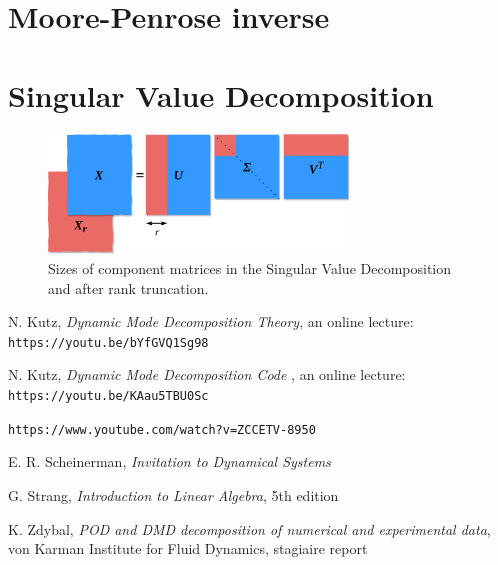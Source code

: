 \documentclass[10pt,twocolumn]{article}
\begin{document}
\section{Moore-Penrose inverse} \label{app:B}




\section{Singular Value Decomposition} \label{app:C}


\begin{figure}[H]
\centering\includegraphics[width=8cm]{svd.png}
\caption{Sizes of component matrices in the Singular Value Decomposition and after rank truncation.}
\label{fig:linear_system}
\end{figure}


\thebibliography{}

 N. Kutz, \textit{Dynamic Mode Decomposition Theory}, an online lecture: \verb|https://youtu.be/bYfGVQ1Sg98| \label{bib:kutz_1}

 N. Kutz, \textit{Dynamic Mode Decomposition Code }, an online lecture: \verb|https://youtu.be/KAau5TBU0Sc| \label{bib:kutz_2}

 \verb|https://www.youtube.com/watch?v=ZCCETV-8950| \label{bib:andymation}

 E. R. Scheinerman, \textit{Invitation to Dynamical Systems}

 G. Strang, \textit{Introduction to Linear Algebra}, 5th edition

 K. Zdybal, \textit{POD and DMD decomposition of numerical and experimental data}, von Karman Institute for Fluid Dynamics, stagiaire report 
\end{document}
